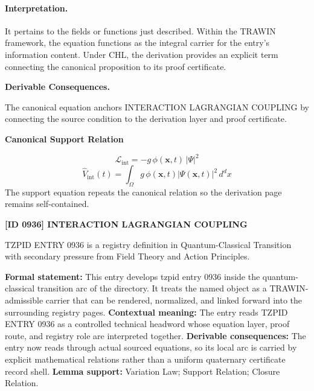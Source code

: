\paragraph{Interpretation.}
It pertains to the fields or functions just described. Within the TRAWIN framework, the equation functions as the integral carrier for the entry’s information content. Under CHL, the derivation provides an explicit term connecting the canonical proposition to its proof certificate.

\par\vspace{0.35em}
\noindent\textbf{Derivable Consequences.}\quad
\begingroup
\footnotesize
\raggedright
The canonical equation anchors INTERACTION LAGRANGIAN COUPLING by connecting the source condition to the derivation layer and proof certificate.
\par\endgroup

\noindent\textbf{Canonical Support Relation}\par
\[
\mathcal{L}_{\mathrm{int}}=-g\,\phi(\mathbf{x},t)\,|\Psi|^2
\]
\[
\hat{V}_{\mathrm{int}}(t)=\int_{\Omega} g\,\phi(\mathbf{x},t)|\Psi(\mathbf{x},t)|^2\,d^d x
\]
\noindent The support equation repeats the canonical relation so the derivation page remains self-contained.\par

\clearpage
\noindent\textbf{[ID 0936] INTERACTION LAGRANGIAN COUPLING}\par
\vspace{0.35em}
\begingroup\small
{}
TZPID ENTRY 0936 is a registry definition in Quantum-Classical Transition with secondary pressure from Field Theory and Action Principles.

\begingroup\footnotesize\setlength{\emergencystretch}{3em}\sloppy
\textbf{Formal statement:} This entry develops tzpid entry 0936 inside the quantum-classical transition arc of the directory. It treats the named object as a TRAWIN-admissible carrier that can be rendered, normalized, and linked forward into the surrounding registry pages. \textbf{Contextual meaning:} The entry reads TZPID ENTRY 0936 as a controlled technical headword whose equation layer, proof route, and registry role are interpreted together. \textbf{Derivable consequences:} The entry now reads through actual sourced equations, so its local arc is carried by explicit mathematical relations rather than a uniform quaternary certificate record shell. \textbf{Lemma support:} Variation Law; Support Relation; Closure Relation.\par
\endgroup

